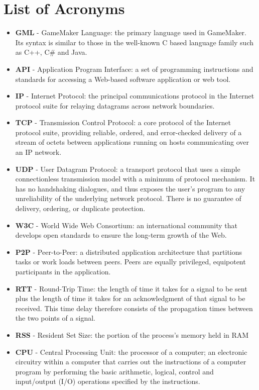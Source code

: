 \documentclass[bsc, 12pt, twoside, singlespacing, parskip, abbrevs, notimes, normalheadings, logo]{styles/infthesis}
\begin{document}
\section*{List of Acronyms}
\begin{itemize}
\item \textbf{GML} - GameMaker Language: the primary language used in GameMaker. Its syntax is similar to those in the well-known C based language family such as C++, C\# and Java.
\item \textbf{API} - Application Program Interface: a set of programming instructions and standards for accessing a Web-based software application or web tool.
\item \textbf{IP} - Internet Protocol: the principal communications protocol in the Internet protocol suite for relaying datagrams across network boundaries.
\item \textbf{TCP} - Transmission Control Protocol: a core protocol of the Internet protocol suite, providing reliable, ordered, and error-checked delivery of a stream of octets between applications running on hosts communicating over an IP network.
\item \textbf{UDP} - User Datagram Protocol: a transport protocol that uses a simple connectionless transmission model with a minimum of protocol mechanism. It has no handshaking dialogues, and thus exposes the user's program to any unreliability of the underlying network protocol. There is no guarantee of delivery, ordering, or duplicate protection.
\item \textbf{W3C} - World Wide Web Consortium: an international community that develops open standards to ensure the long-term growth of the Web.
\item \textbf{P2P} - Peer-to-Peer: a distributed application architecture that partitions tasks or work loads between peers. Peers are equally privileged, equipotent participants in the application.
\item \textbf{RTT} - Round-Trip Time: the length of time it takes for a signal to be sent plus the length of time it takes for an acknowledgment of that signal to be received. This time delay therefore consists of the propagation times between the two points of a signal.
\item \textbf{RSS} - Resident Set Size: the portion of the process's memory held in RAM
\item \textbf{CPU} - Central Processing Unit: the processor of a computer; an electronic circuitry within a computer that carries out the instructions of a computer program by performing the basic arithmetic, logical, control and input/output (I/O) operations specified by the instructions.

\end{itemize}
\end{document}
